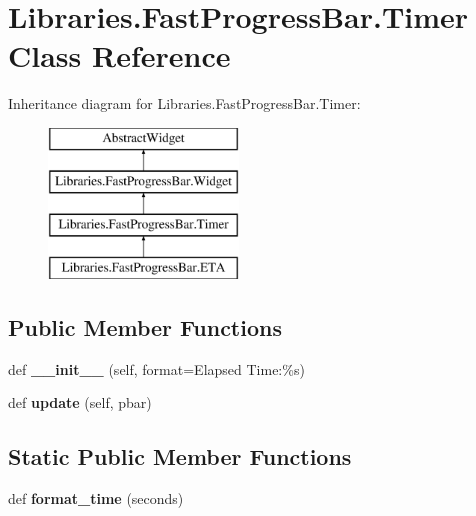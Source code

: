 \hypertarget{class_libraries_1_1_fast_progress_bar_1_1_timer}{}\section{Libraries.\+Fast\+Progress\+Bar.\+Timer Class Reference}
\label{class_libraries_1_1_fast_progress_bar_1_1_timer}
Inheritance diagram for Libraries.\+Fast\+Progress\+Bar.\+Timer\+:\begin{figure}[H]
\begin{center}
\leavevmode
\includegraphics[height=4.000000cm]{class_libraries_1_1_fast_progress_bar_1_1_timer}
\end{center}
\end{figure}
\subsection*{Public Member Functions}
\begin{DoxyCompactItemize}
\item 
def {\bfseries \+\_\+\+\_\+init\+\_\+\+\_\+} (self, format=\textquotesingle{}Elapsed Time\+:\%s\textquotesingle{})\hypertarget{class_libraries_1_1_fast_progress_bar_1_1_timer_a8bc282ff486db4a83e6693a6a1b1cd20}{}\label{class_libraries_1_1_fast_progress_bar_1_1_timer_a8bc282ff486db4a83e6693a6a1b1cd20}

\item 
def {\bfseries update} (self, pbar)\hypertarget{class_libraries_1_1_fast_progress_bar_1_1_timer_ae2152f6617faea1c6a28e9e1a7c0c631}{}\label{class_libraries_1_1_fast_progress_bar_1_1_timer_ae2152f6617faea1c6a28e9e1a7c0c631}

\end{DoxyCompactItemize}
\subsection*{Static Public Member Functions}
\begin{DoxyCompactItemize}
\item 
def {\bfseries format\+\_\+time} (seconds)\hypertarget{class_libraries_1_1_fast_progress_bar_1_1_timer_a8636abc809b9b31cfcf514fbbdc524c9}{}\label{class_libraries_1_1_fast_progress_bar_1_1_timer_a8636abc809b9b31cfcf514fbbdc524c9}

\end{DoxyCompactItemize}
